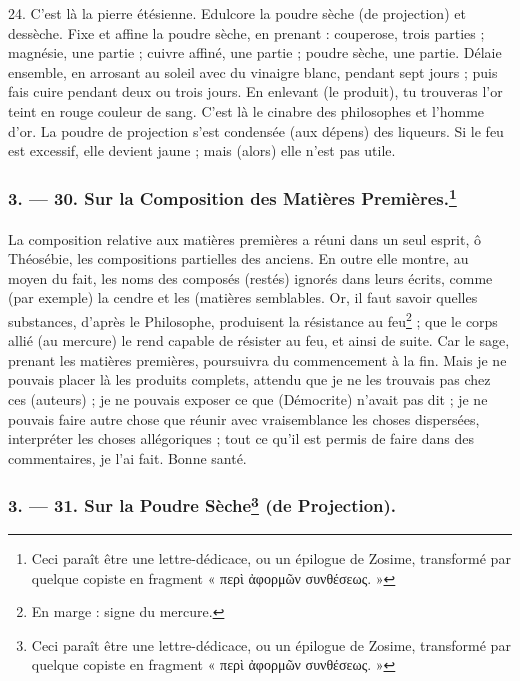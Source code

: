 \documentclass[landscape, a4paper, 11pt, oneside, polutonikogreek, french]{article}
\begin{document}
24. C'est là la pierre étésienne. Edulcore la poudre sèche (de projection) et dessèche. Fixe et affine la poudre sèche, en prenant : couperose, trois parties ; magnésie, une partie ; cuivre affiné, une partie ; poudre sèche, une partie. Délaie ensemble, en arrosant au soleil avec du vinaigre blanc, pendant sept jours ; puis fais cuire pendant deux ou trois jours. En enlevant (le produit), tu trouveras l'or teint en rouge couleur de sang. C'est là le cinabre des philosophes et l'homme d'or. La poudre de projection s'est condensée (aux dépens) des liqueurs. Si le feu est excessif, elle devient jaune ; mais (alors) elle n'est pas utile.

\bigskip
\centerline{\EightStarTaper}
\centerline{\EightStarTaper\EightStarTaper}
\bigskip

\subsubsection[3. --- 30. Sur la Composition des Matières Premières.]{3. --- 30. Sur la Composition des Matières Premières.\footnote{Ceci paraît être une lettre-dédicace, ou un épilogue de Zosime, transformé par quelque copiste en fragment « περὶ ἀφορμῶν συνθέσεως. »}}
\paragraph{}
La composition relative aux matières premières a réuni dans un seul esprit, ô Théosébie, les compositions partielles des anciens. En outre elle montre, au moyen du fait, les noms des composés (restés) ignorés dans leurs écrits, comme (par exemple) la cendre et les (matières semblables. Or, il faut savoir quelles substances, d'après le Philosophe, produisent la résistance au feu\footnote{En marge : signe du mercure.} ; que le corps allié (au mercure) le rend capable de résister au feu, et ainsi de suite. Car le sage, prenant les matières premières, poursuivra du commencement à la fin. Mais je ne pouvais placer là les produits complets, attendu que je ne les trouvais pas chez ces (auteurs) ; je ne pouvais exposer ce que (Démocrite) n'avait pas dit ; je ne pouvais faire autre chose que réunir avec vraisemblance les choses dispersées, interpréter les choses allégoriques ; tout ce qu'il est permis de faire dans des commentaires, je l'ai fait. Bonne santé.

\bigskip
\centerline{\EightStarTaper}
\centerline{\EightStarTaper\EightStarTaper}
\bigskip

\subsubsection[3. --- 31. Sur la Poudre Sèche (de Projection).]{3. --- 31. Sur la Poudre Sèche\footnote{Ceci paraît être une lettre-dédicace, ou un épilogue de Zosime, transformé par quelque copiste en fragment « περὶ ἀφορμῶν συνθέσεως. »} (de Projection).}
\end{document}
